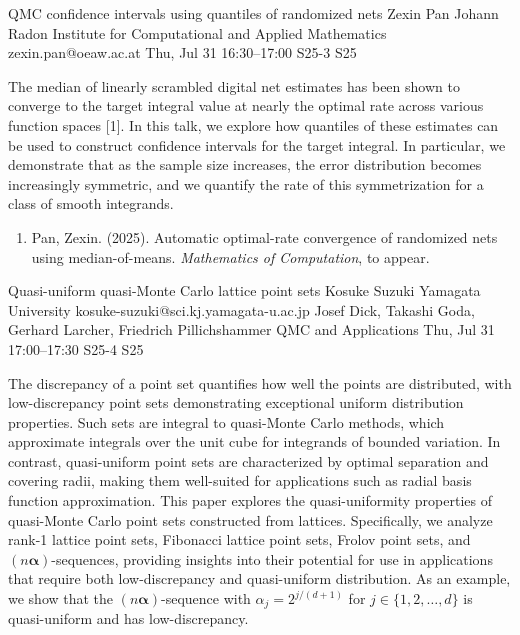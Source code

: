 \documentclass[12pt,lettersize,oneside]{book} %
\begin{document}
\begin{talk}
  {QMC confidence intervals using quantiles of randomized nets}%
  {Zexin Pan}%
  {Johann Radon Institute for Computational and Applied Mathematics}%
  {zexin.pan@oeaw.ac.at}%
  {}%
  {}%
  {Thu, Jul 31 16:30--17:00}%
  {S25-3}%
  {S25}%
  {}%
  
    


The median of linearly scrambled digital net estimates has been shown to converge to the target integral value at nearly the optimal rate across various function spaces [1]. In this talk, we explore how quantiles of these estimates can be used to construct confidence intervals for the target integral. In particular, we demonstrate that as the sample size increases, the error distribution becomes increasingly symmetric, and we quantify the rate of this symmetrization for a class of smooth integrands.
            
\medskip


\begin{enumerate}
 \item[{[1]}] Pan, Zexin. (2025). Automatic optimal-rate convergence of randomized nets using median-of-means. {\it  Mathematics of Computation}, to appear.
\end{enumerate}

\end{talk}

\begin{talk}
  {Quasi-uniform quasi-Monte Carlo lattice point sets}%
  {Kosuke Suzuki}%
  {Yamagata University}%
  {kosuke-suzuki@sci.kj.yamagata-u.ac.jp}%
  {Josef Dick, Takashi Goda, Gerhard Larcher, Friedrich Pillichshammer}%
  {QMC and Applications}%
  {Thu, Jul 31 17:00--17:30}%
  {S25-4}%
  {S25}%
    
   

The discrepancy of a point set quantifies how well the points are distributed, with low-discrepancy point sets demonstrating exceptional uniform distribution properties. Such sets are integral to quasi-Monte Carlo methods, which approximate integrals over the unit cube for integrands of bounded variation. In contrast, quasi-uniform point sets are characterized by optimal separation and covering radii, making them well-suited for applications such as radial basis function approximation. This paper explores the quasi-uniformity properties of quasi-Monte Carlo point sets constructed from lattices. Specifically, we analyze rank-1 lattice point sets, Fibonacci lattice point sets, Frolov point sets, and $(n \boldsymbol{\alpha})$-sequences, providing insights into their potential for use in applications that require both low-discrepancy and quasi-uniform distribution. As an example, we show that the $(n \boldsymbol{\alpha})$-sequence with $\alpha_j = 2^{j/(d+1)}$ for $j \in \{1, 2, \ldots, d\}$ is quasi-uniform and has low-discrepancy.


\end{talk}
\end{document}
